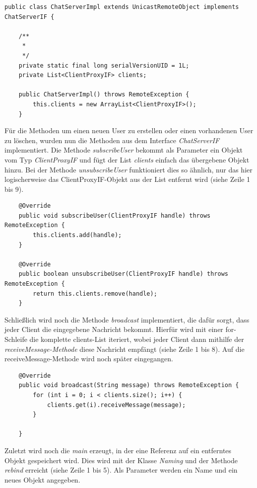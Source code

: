 \begin{lstlisting}
public class ChatServerImpl extends UnicastRemoteObject implements ChatServerIF {

	/**
	 * 
	 */
	private static final long serialVersionUID = 1L;
	private List<ClientProxyIF> clients;

	public ChatServerImpl() throws RemoteException {
		this.clients = new ArrayList<ClientProxyIF>();
	}
\end{lstlisting}


Für die Methoden um einen neuen User zu erstellen oder einen vorhandenen User zu löschen, wurden nun die Methoden aus dem Interface \textit{ChatServerIF} implementiert. Die Methode \textit{subscribeUser} bekommt als Parameter ein Objekt vom Typ \textit{ClientProxyIF} und fügt der List \textit{clients} einfach das übergebene Objekt hinzu. Bei der Methode \textit{unsubscribeUser} funktioniert dies so ähnlich, nur das hier logischerweise das ClientProxyIF-Objekt aus der List entfernt wird (siehe Zeile 1 bis 9).

\begin{lstlisting}
	@Override
	public void subscribeUser(ClientProxyIF handle) throws RemoteException {
		this.clients.add(handle);
	}

	@Override
	public boolean unsubscribeUser(ClientProxyIF handle) throws RemoteException {
		return this.clients.remove(handle);
	}
\end{lstlisting}


Schließlich wird noch die Methode \textit{broadcast} implementiert, die dafür sorgt, dass jeder Client die eingegebene Nachricht bekommt. Hierfür wird mit einer for-Schleife die komplette clients-List iteriert, wobei jeder Client dann mithilfe der \textit{receiveMessage-Methode} diese Nachricht empfängt (siehe Zeile 1 bis 8). Auf die receiveMessage-Methode wird noch später eingegangen.

\begin{lstlisting}
	@Override
	public void broadcast(String message) throws RemoteException {
		for (int i = 0; i < clients.size(); i++) {
			clients.get(i).receiveMessage(message);
		}

	}
\end{lstlisting}	


Zuletzt wird noch die \textit{main} erzeugt, in der eine Referenz auf ein entferntes Objekt gespeichert wird. Dies wird mit der Klasse \textit{Naming} und der Methode \textit{rebind} erreicht (siehe Zeile 1 bis 5). Als Parameter werden ein Name und ein neues Objekt angegeben.

